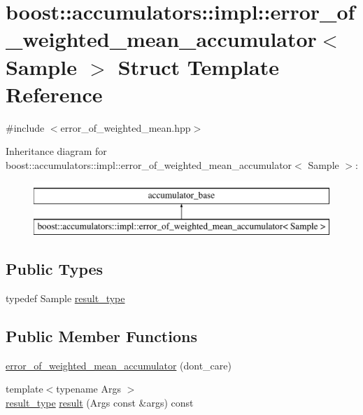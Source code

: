\hypertarget{structboost_1_1accumulators_1_1impl_1_1error__of__weighted__mean__accumulator}{}\section{boost\+:\+:accumulators\+:\+:impl\+:\+:error\+\_\+of\+\_\+weighted\+\_\+mean\+\_\+accumulator$<$ Sample $>$ Struct Template Reference}
\label{structboost_1_1accumulators_1_1impl_1_1error__of__weighted__mean__accumulator}


{\ttfamily \#include $<$error\+\_\+of\+\_\+weighted\+\_\+mean.\+hpp$>$}

Inheritance diagram for boost\+:\+:accumulators\+:\+:impl\+:\+:error\+\_\+of\+\_\+weighted\+\_\+mean\+\_\+accumulator$<$ Sample $>$\+:\begin{figure}[H]
\begin{center}
\leavevmode
\includegraphics[height=2.000000cm]{structboost_1_1accumulators_1_1impl_1_1error__of__weighted__mean__accumulator}
\end{center}
\end{figure}
\subsection*{Public Types}
\begin{DoxyCompactItemize}
\item 
typedef Sample \hyperlink{structboost_1_1accumulators_1_1impl_1_1error__of__weighted__mean__accumulator_ab3d7f50fee0fc4db6027b1c6d3be5452}{result\+\_\+type}
\end{DoxyCompactItemize}
\subsection*{Public Member Functions}
\begin{DoxyCompactItemize}
\item 
\hyperlink{structboost_1_1accumulators_1_1impl_1_1error__of__weighted__mean__accumulator_a8a36180d9550b410b62049742f63ad39}{error\+\_\+of\+\_\+weighted\+\_\+mean\+\_\+accumulator} (dont\+\_\+care)
\item 
{\footnotesize template$<$typename Args $>$ }\\\hyperlink{structboost_1_1accumulators_1_1impl_1_1error__of__weighted__mean__accumulator_ab3d7f50fee0fc4db6027b1c6d3be5452}{result\+\_\+type} \hyperlink{structboost_1_1accumulators_1_1impl_1_1error__of__weighted__mean__accumulator_a5178718380e2f52c0b14b3a82eb63ce7}{result} (Args const \&args) const 
\end{DoxyCompactItemize}



